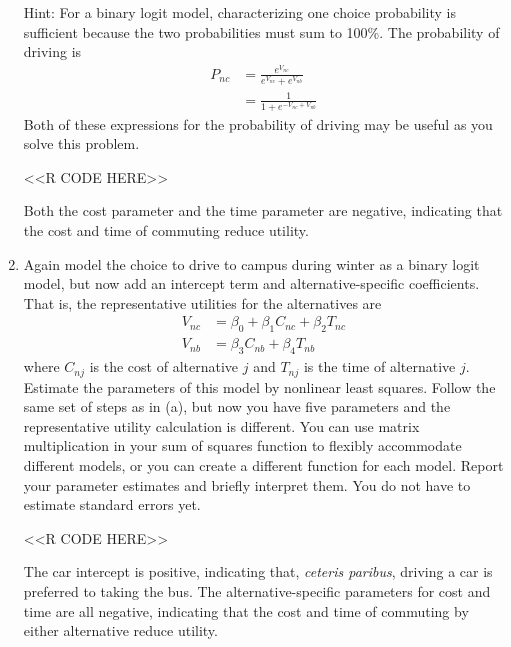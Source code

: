 \documentclass[11pt,letterpaper]{article}
\begin{document}
\begin{enumerate}[label=\alph*., leftmargin=*]
	Hint: For a binary logit model, characterizing one choice probability is sufficient because the two probabilities must sum to 100\%. The probability of driving is
	\begin{align*}
		P_{nc} &= \frac{e^{V_{nc}}}{e^{V_{nc}} + e^{V_{nb}}} \\
		&= \frac{1}{1 + e^{-V_{nc} + V_{nb}}}
	\end{align*}
	Both of these expressions for the probability of driving may be useful as you solve this problem.

	<<R CODE HERE>>

	Both the cost parameter and the time parameter are negative, indicating that the cost and time of commuting reduce utility.

	\item Again model the choice to drive to campus during winter as a binary logit model, but now add an intercept term and alternative-specific coefficients. That is, the representative utilities for the alternatives are
	\begin{align*}
		V_{nc} &= \beta_0 + \beta_1 C_{nc} + \beta_2 T_{nc} \\
		V_{nb} &= \beta_3 C_{nb} + \beta_4 T_{nb}
	\end{align*}
	where $C_{nj}$ is the cost of alternative $j$ and $T_{nj}$ is the time of alternative $j$. Estimate the parameters of this model by nonlinear least squares. Follow the same set of steps as in (a), but now you have five parameters and the representative utility calculation is different. You can use matrix multiplication in your sum of squares function to flexibly accommodate different models, or you can create a different function for each model. Report your parameter estimates and briefly interpret them. You do not have to estimate standard errors yet.

	<<R CODE HERE>>

	The car intercept is positive, indicating that, \emph{ceteris paribus}, driving a car is preferred to taking the bus. The alternative-specific parameters for cost and time are all negative, indicating that the cost and time of commuting by either alternative reduce utility.


\end{enumerate}
\end{document}

